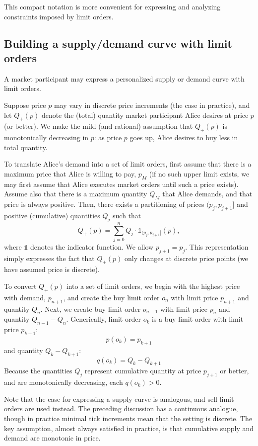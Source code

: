 \documentclass[11pt, reqno]{amsart}
\theoremstyle{definition}
\theoremstyle{remark}
\begin{document}
This compact notation is more convenient for expressing and analyzing
constraints imposed by limit orders.

\subsection{Building a supply/demand curve with limit orders}

A market participant may express a personalized supply or demand curve with
limit orders.

Suppose price $p$ may vary in discrete price increments (the case in practice),
and let $Q_+(p)$ denote the (total) quantity market participant Alice desires
at price $p$ (or better).  We make the mild (and rational) assumption that
$Q_+(p)$ is monotonically decreasing in $p$: as price $p$ goes up, Alice desires
to buy less in total quantity.

To translate Alice's demand into a set of limit orders, first assume that there
is a maximum price that Alice is willing to pay, $p_M$ (if no such upper limit
exists, we may first assume that Alice executes market orders until such a
price exists). Assume also that there is a maximum quantity $Q_M$ that Alice
demands, and that price is always positive. Then, there exists a partitioning
of prices $(p_j, p_{j + 1}]$ and positive (cumulative) quantities $Q_j$ such
that
\[
    Q_+(p) = \sum_{j = 0}^n Q_j \cdot \mathbb{1}_{(p_j, p_{j + 1}]}(p),
\]
where $\mathbb{1}$ denotes the indicator function. We allow $p_{j + 1} = p_j$.
This representation simply expresses the fact that $Q_+(p)$ only changes at
discrete price points (we have assumed price is discrete).

To convert $Q_+(p)$ into a set of limit orders, we begin with the highest price
with demand, $p_{n + 1}$, and create the buy limit order $o_n$ with limit price
$p_{n + 1}$ and quantity $Q_n$. Next, we create buy limit order $o_{n - 1}$ with
limit price $p_n$ and quantity $Q_{n - 1} - Q_n$. Generically, limit order
$o_k$ is a buy limit order with limit price $p_{k + 1}$:
\[
    p(o_k) = p_{k + 1}
\]
and quantity $Q_k - Q_{k + 1}$:
\[
    q(o_k) = Q_k - Q_{k + 1}
\]
Because the quantities $Q_j$ represent cumulative quantity at price
$p_{j + 1}$ or better, and are monotonically decreasing, each $q(o_k) > 0$.

Note that the case for expressing a supply curve is analogous, and sell limit
orders are used instead. The preceding discussion has a continuous analogue,
though in practice minimal tick increments mean that the setting is discrete.
The key assumption, almost always satisfied in practice, is that cumulative
supply and demand are monotonic in price.
\end{document}
